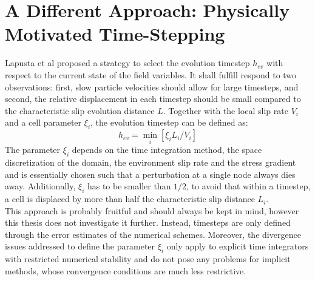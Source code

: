 \section{A Different Approach: Physically Motivated Time-Stepping}
Lapusta et al \cite{Lapusta} proposed a strategy to select the evolution timestep $h_{ev}$ with respect to the current state of the field variables. It shall fulfill respond to two observations: first, slow particle velocities should allow for large timesteps, and second, the relative displacement in each timestep should be small compared to the characteristic slip evolution distance $L$. Together with the local slip rate $V_i$ and a cell parameter $\xi_i$, the evolution timestep can be defined as:
\begin{equation}
	h_{ev} = \min_i\left[\xi_i L_i / V_i \right]
\end{equation}
The parameter $\xi_i$ depends on the time integration method, the space discretization of the domain, the environment slip rate and the stress gradient and is essentially chosen such that a perturbation at a single node always dies away. Additionally, $\xi_i$ has to be smaller than $1/2$, to avoid that within a timestep, a cell is displaced by more than half the characteristic slip distance $L_i$. \\
This approach is probably fruitful and should always be kept in mind, however this thesis does not investigate it further. Instead, timesteps are only defined through the error estimates of the numerical schemes. Moreover, the divergence issues addressed to define the parameter $\xi_i$ only apply to explicit time integrators with restricted numerical stability and do not pose any problems for implicit methods, whose convergence conditions are much less restrictive.